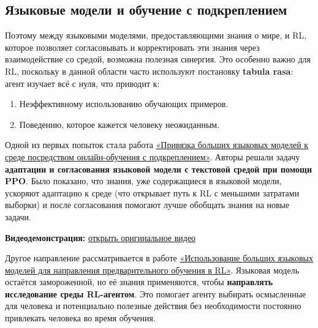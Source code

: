 \documentclass[11pt,a4paper]{article}
\begin{document}

\subsection{Языковые модели и обучение с подкреплением}\label{lms-and-rl}

Поэтому между языковыми моделями, предоставляющими знания о мире, и RL, которое позволяет согласовывать и корректировать эти знания через взаимодействие со средой, возможна полезная синергия. Это особенно важно для RL, поскольку в данной области часто используют постановку \textbf{tabula rasa}: агент изучает всё с нуля, что приводит к:

\begin{enumerate}
\def\labelenumi{\arabic{enumi})}
\item
  Неэффективному использованию обучающих примеров.
\item
  Поведению, которое кажется человеку неожиданным.
\end{enumerate}

Одной из первых попыток стала работа \href{https://arxiv.org/abs/2302.02662v1}{«Привязка больших языковых моделей к среде посредством онлайн-обучения с подкреплением»}. Авторы решали задачу \textbf{адаптации и согласования языковой модели с текстовой средой при помощи PPO}. Было показано, что знания, уже содержащиеся в языковой модели, ускоряют адаптацию к среде (что открывает путь к RL с меньшими затратами выборки) и после согласования помогают лучше обобщать знания на новые задачи.

\textbf{Видеодемонстрация:} \href{https://huggingface.co/datasets/huggingface-deep-rl-course/course-images/resolve/main/en/unit12/papier_v4.mp4}{открыть оригинальное видео}

Другое направление рассматривается в работе \href{https://arxiv.org/abs/2302.06692}{«Использование больших языковых моделей для направления предварительного обучения в RL»}. Языковая модель остаётся замороженной, но её знания применяются, чтобы \textbf{направлять исследование среды RL-агентом}. Это помогает агенту выбирать осмысленные для человека и потенциально полезные действия без необходимости постоянно привлекать человека во время обучения.
\end{document}

